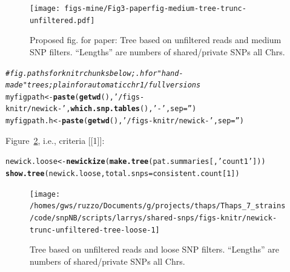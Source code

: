 \documentclass{article}\usepackage[]{graphicx}\usepackage[]{color}
\makeatletter
\newcommand{\hlnum}[1]{\textcolor[rgb]{0.686,0.059,0.569}{#1}}%
\newcommand{\hlstr}[1]{\textcolor[rgb]{0.192,0.494,0.8}{#1}}%
\newcommand{\hlcom}[1]{\textcolor[rgb]{0.678,0.584,0.686}{\textit{#1}}}%
\newcommand{\hlstd}[1]{\textcolor[rgb]{0.345,0.345,0.345}{#1}}%
\newcommand{\hlkwb}[1]{\textcolor[rgb]{0.69,0.353,0.396}{#1}}%
\newcommand{\hlkwc}[1]{\textcolor[rgb]{0.333,0.667,0.333}{#1}}%
\newcommand{\hlkwd}[1]{\textcolor[rgb]{0.737,0.353,0.396}{\textbf{#1}}}%
\newenvironment{kframe}{%
 \def\at@end@of@kframe{}%
 \ifinner\ifhmode%
  \def\at@end@of@kframe{\end{minipage}}%
  \begin{minipage}{\columnwidth}%
 \fi\fi%
 \def\FrameCommand##1{\hskip\@totalleftmargin \hskip-\fboxsep
 \colorbox{shadecolor}{##1}\hskip-\fboxsep
     \hskip-\linewidth \hskip-\@totalleftmargin \hskip\columnwidth}%
 \MakeFramed {\advance\hsize-\width
   \@totalleftmargin\z@ \linewidth\hsize
   \@setminipage}}%
 {\par\unskip\endMakeFramed%
 \at@end@of@kframe}
\newenvironment{knitrout}{}{} %
\makeatother
\begin{document}
\begin{figure}
  \hspace*{-1in}%
  \texttt{[image: figs-mine/Fig3-paperfig-medium-tree-trunc-unfiltered.pdf]}
  \caption{Proposed fig. for paper: Tree based on unfiltered reads and medium SNP filters.  ``Lengths'' are numbers of shared/private SNPs all Chrs.}
  \label{fig:tree-paper}
\end{figure}

\begin{knitrout}\scriptsize
{}\color{fgcolor}\begin{kframe}
\begin{alltt}
\hlcom{# fig.paths for knitr chunks below;  .h for "hand-made" trees; plain for automatic chr1/full versions}
\hlstd{myfigpath}   \hlkwb{<-} \hlkwd{paste}\hlstd{(}\hlkwd{getwd}\hlstd{(),} \hlstr{'/figs-knitr/newick-'}\hlstd{,} \hlkwd{which.snp.tables}\hlstd{(),} \hlstr{'-'}\hlstd{,} \hlkwc{sep}\hlstd{=}\hlstr{''}\hlstd{)}
\hlstd{myfigpath.h} \hlkwb{<-} \hlkwd{paste}\hlstd{(}\hlkwd{getwd}\hlstd{(),} \hlstr{'/figs-knitr/newick-'}\hlstd{,} \hlkwc{sep}\hlstd{=}\hlstr{''}\hlstd{)}
\end{alltt}
\end{kframe}
\end{knitrout}

Figure~\ref{fig:tree-loose}, i.e., criteria [[1]]:

\begin{knitrout}\scriptsize
{}\color{fgcolor}\begin{kframe}
\begin{alltt}
\hlstd{newick.loose} \hlkwb{<-} \hlkwd{newickize}\hlstd{(}\hlkwd{make.tree}\hlstd{(pat.summaries[,}\hlstr{'count1'}\hlstd{]))}
\hlkwd{show.tree}\hlstd{(newick.loose,} \hlkwc{total.snps}\hlstd{=consistent.count[}\hlnum{1}\hlstd{])}
\end{alltt}
\end{kframe}\begin{figure}

{\centering \texttt{[image: /homes/gws/ruzzo/Documents/g/projects/thaps/Thaps\_7\_strains/code/snpNB/scripts/larrys/shared-snps/figs-knitr/newick-trunc-unfiltered-tree-loose-1]} 

}

\caption[Tree based on unfiltered reads and loose SNP filters]{Tree based on unfiltered reads and loose SNP filters.  ``Lengths'' are numbers of shared/private SNPs all Chrs.}\label{fig:tree-loose}
\end{figure}


\end{knitrout}
\end{document}
